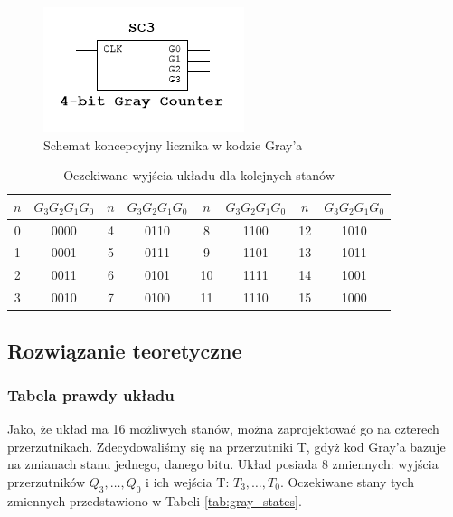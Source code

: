 \documentclass[12pt,a4paper,table]{article}
\begin{document}
    \begin{figure}[h]
        \centering
        \includegraphics[]{images/gray_idea.PNG}
        \caption{Schemat koncepcyjny licznika w kodzie Gray'a}
        \label{fig:gray_idea}
    \end{figure}

    \begin{table}[h]
        \centering
        \begin{tabular}{|cc|cc|cc|cc|}
            \hline
            $n$ & $G_3G_2G_1G_0 $ & $n$ & $G_3G_2G_1G_0 $ & $n$ & $G_3G_2G_1G_0 $ & $n$ & $G_3G_2G_1G_0 $ \\
            \hline
            0 & 0000 & 4 & 0110 & 8  & 1100 & 12 & 1010 \\
            1 & 0001 & 5 & 0111 & 9  & 1101 & 13 & 1011 \\
            2 & 0011 & 6 & 0101 & 10 & 1111 & 14 & 1001 \\
            3 & 0010 & 7 & 0100 & 11 & 1110 & 15 & 1000 \\
            \hline
        \end{tabular}
        \caption{Oczekiwane wyjścia układu dla kolejnych stanów}
        \label{tab:gray_exp_output}
    \end{table}

    \pagebreak
    \subsection{Rozwiązanie teoretyczne}
    \subsubsection{Tabela prawdy układu}
    Jako, że układ ma 16 możliwych stanów, można zaprojektować go na czterech przerzutnikach. 
    Zdecydowaliśmy się na przerzutniki T, gdyż kod Gray'a bazuje na zmianach stanu jednego, danego bitu.
    Układ posiada 8 zmiennych: wyjścia przerzutników $Q_3, \dots, Q_0$ i ich wejścia T: $T_3, \dots, T_0$.
    Oczekiwane stany tych zmiennych przedstawiono w Tabeli \ref{tab:gray_states}.
\end{document}
